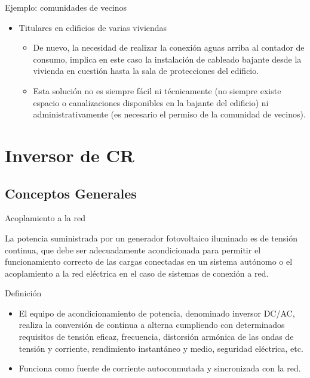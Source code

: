 \documentclass[xcolor={usenames,svgnames,dvipsnames}]{beamer}
\begin{document}
\begin{frame}[label=sec-1-4-6]{Ejemplo: comunidades de vecinos}
\begin{itemize}
\item \alert{Titulares en edificios de varias viviendas}

\begin{itemize}
\item De nuevo, la necesidad de realizar la conexión aguas arriba al contador de consumo, implica en este caso la instalación de cableado bajante desde la vivienda en cuestión hasta la sala de protecciones del edificio.

\item Esta solución no es siempre fácil ni técnicamente (no siempre existe espacio o canalizaciones disponibles en la bajante del edificio) ni administrativamente (es necesario el permiso de la comunidad de vecinos).
\end{itemize}
\end{itemize}
\end{frame}

\section{Inversor de CR}
\label{sec-2}

\subsection{Conceptos Generales}
\label{sec-2-1}
\begin{frame}[label=sec-2-1-1]{Acoplamiento a la red}
\begin{exampleblock}{}
La potencia suministrada por un generador fotovoltaico iluminado es de
tensión continua, que debe ser adecuadamente acondicionada para permitir
el funcionamiento correcto de las cargas conectadas en un sistema
autónomo o el acoplamiento a la red eléctrica en el caso de sistemas de
conexión a red.
\end{exampleblock}
\end{frame}

\begin{frame}[label=sec-2-1-2]{Definición}
\begin{itemize}
\item El equipo de acondicionamiento de potencia, denominado inversor DC/AC, realiza la \alert{conversión de continua a alterna cumpliendo con  determinados requisitos} de tensión eficaz, frecuencia, distorsión armónica de las ondas de tensión y corriente, rendimiento instantáneo y medio, seguridad eléctrica, etc.

\item Funciona como fuente de corriente autoconmutada y sincronizada con la red.
\end{itemize}
\end{frame}
\end{document}

